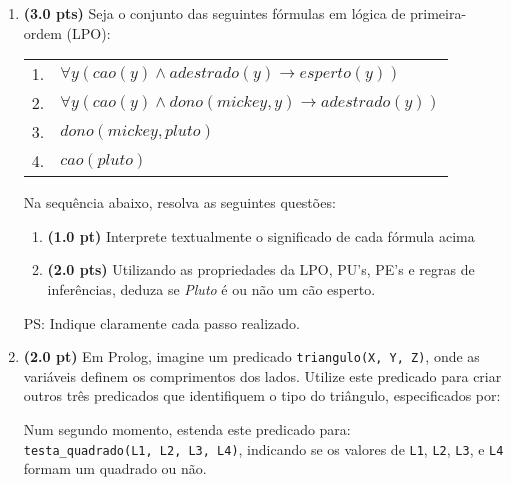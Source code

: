 \documentclass[a4paper,12pt]{article}
\begin{document}
\begin{enumerate}
\item {\bf (3.0 pts)} Seja o conjunto das seguintes fórmulas em lógica de primeira-ordem (LPO):\\
\begin{center}
\begin{tabular}{ll}
 \hline \hline
    1. &  $\forall y ( cao(y) \wedge adestrado(y) \rightarrow esperto(y))$ \\
    2. &  $\forall y ( cao(y) \wedge dono(mickey,y) \rightarrow adestrado(y) ) $ \\
    3. &  $ dono(mickey, pluto) $ \\
    4. &  $ cao(pluto) $ \\
    \hline \hline
 \end{tabular}
\end{center}
 
Na sequência abaixo, resolva as seguintes questões:

\begin{enumerate}
\setlength{\itemsep}{-3pt}
\item {\bf (1.0 pt)} Interprete textualmente o significado de cada fórmula acima
\item {\bf (2.0 pts)} Utilizando as propriedades da LPO, PU's, PE's e regras de inferências, deduza se {\it Pluto} é ou não um cão esperto.
\end{enumerate}
PS: Indique claramente cada passo realizado.

\item {\bf (2.0 pt)} Em Prolog, imagine um predicado {\tt triangulo(X, Y, Z)}, onde as variáveis definem os comprimentos dos lados. Utilize este predicado para criar outros três predicados que identifiquem
o tipo do triângulo, especificados por:

Num segundo momento, estenda este predicado para:\\
{\tt testa\_quadrado(L1, L2, L3, L4)}, indicando se os valores de  
\texttt{L1}, \texttt{L2}, \texttt{L3}, e \texttt{L4} 
formam um quadrado ou não.\\


\end{enumerate}
\end{document}
